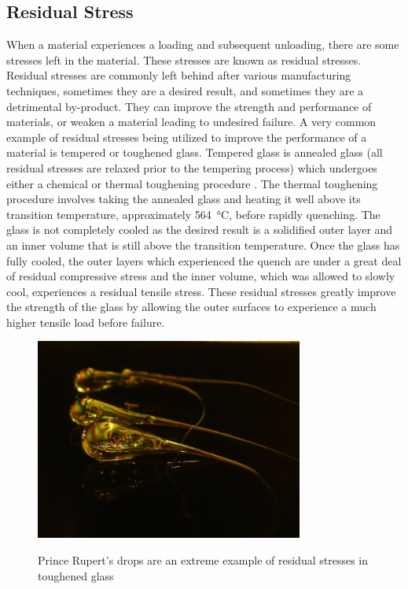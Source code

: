 \documentclass[11pt, oneside]{article}   	%
\begin{document}
\subsection{Residual Stress}
When a material experiences a loading and subsequent unloading, there are some stresses left in the material. These stresses are known as residual stresses. Residual stresses are commonly left behind after various manufacturing techniques, sometimes they are a desired result, and sometimes they are a detrimental by-product. They can improve the strength and performance of materials, or weaken a material leading to undesired failure. A very common example of residual stresses being utilized to improve the performance of a material is tempered or toughened glass. 
Tempered glass is annealed glass (all residual stresses are relaxed prior to the tempering process) which undergoes either a chemical or thermal toughening procedure \cite{ToughGlass}. The thermal toughening procedure involves taking the annealed glass and heating it well above its transition temperature, approximately \SI{564}{\celsius}, before rapidly quenching. The glass is not completely cooled as the desired result is a solidified outer layer and an inner volume that is still above the transition temperature. Once the glass has fully cooled, the outer layers which experienced the quench are under a great deal of residual compressive stress and the inner volume, which was allowed to slowly cool, experiences a residual tensile stress. These residual stresses greatly improve the strength of the glass by allowing the outer surfaces to experience a much higher tensile load before failure.
\begin{figure}
	\centering
	\includegraphics[width=250pt]{img/prince_rupert.jpg}
	\caption{Prince Rupert's drops are an extreme example of residual stresses in toughened glass}\cite{RupertDrop} \label{fig:RupertDrop}
\end{figure}
\end{document}
